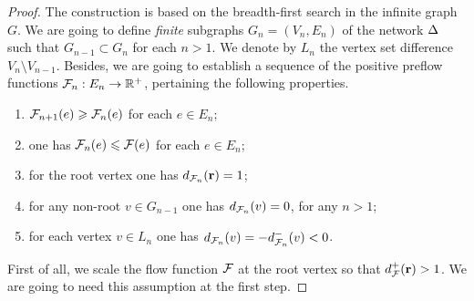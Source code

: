 \documentclass[12pt]{amsart}
\begin{document}
\begin{proof}
      The construction is based on the breadth-first search in the infinite graph $G$.
      We are going to define \emph{finite} subgraphs $G_n = (V_n, E_n)$ of the network $\Delta$ such that $G_{n-1} \subset G_{n}$ for each $n > 1$.
      We denote by $L_n$ the vertex set difference $V_n \setminus V_{n-1}$.
      Besides, we are going to establish a sequence of the positive preflow functions $\mathcal{F}_{n}: E_n \to \mathbb{R}^{+}$,
        pertaining the following properties.
      \begin{enumerate}[label=\textbf{P\arabic*}]
        \item \label{p1} $\mathcal{F}_{n+1}(e) \geqslant \mathcal{F}_{n}(e)$ for each $e \in E_n$;
        \item \label{p2} one has $\mathcal{F}_{n}(e) \leqslant \mathcal{F}(e)$ for each $e \in E_n$;
        \item \label{p3} for the root vertex one has $d_{\mathcal{F}_{n}}(\mathbf{r}) = 1$;
        \item \label{p4} for any non-root $v \in G_{n-1}$ one has $d_{\mathcal{F}_{n}}(v) = 0$, for any $n > 1$;
        \item \label{p5} for each vertex $v \in L_n$ one has $d_{\mathcal{F}_{n}}(v) = -d^{-}_{\mathcal{F}_{n}}(v) < 0$.
      \end{enumerate}
      First of all, we scale the flow function $\mathcal{F}$ at the root vertex so that $d^{+}_{\mathcal{F}}(\mathbf{r}) > 1$.
      We are going to need this assumption at the first step.


\end{proof}
\end{document}

